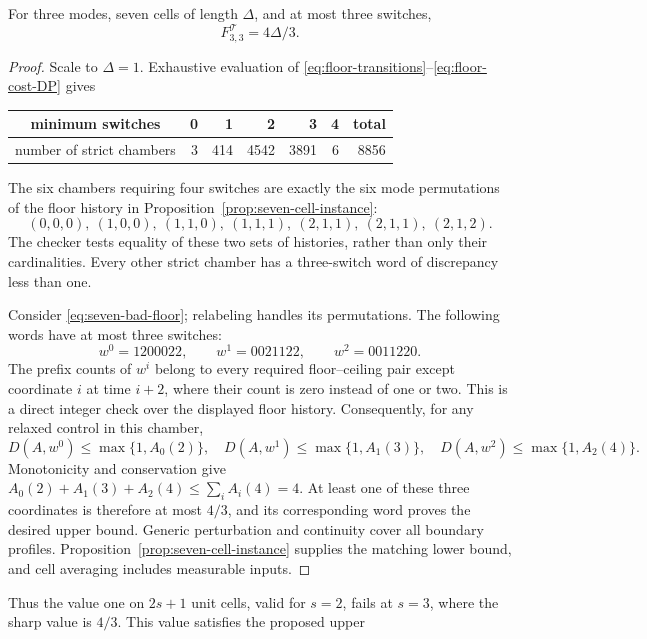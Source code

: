 \begin{theorem}\label{thm:seven-cells}
For three modes, seven cells of length $\Delta$, and at most three switches,
\begin{equation}\label{eq:seven-cells}
 F^{\mathcal T}_{3,3}=4\Delta/3.
\end{equation}
\end{theorem}
\begin{proof}
Scale to $\Delta=1$. Exhaustive evaluation of
\eqref{eq:floor-transitions}--\eqref{eq:floor-cost-DP} gives
\begin{center}
\begin{tabular}{c|rrrrr|r}
minimum switches&0&1&2&3&4&total\\\hline
number of strict chambers&3&414&4542&3891&6&8856
\end{tabular}
\end{center}
The six chambers requiring four switches are exactly the six mode
permutations of the floor history in
Proposition~\ref{prop:seven-cell-instance}:
\begin{equation}\label{eq:seven-bad-floor}
 (0,0,0),\ (1,0,0),\ (1,1,0),\ (1,1,1),\
 (2,1,1),\ (2,1,1),\ (2,1,2).
\end{equation}
The checker tests equality of these two sets of histories, rather than only
their cardinalities. Every other strict chamber has a three-switch word
of discrepancy less than one.

Consider \eqref{eq:seven-bad-floor}; relabeling handles its permutations.
The following words have at most three switches:
\[
 w^0=1200022,\qquad w^1=0021122,\qquad w^2=0011220.
\]
The prefix counts of $w^i$ belong to every required floor--ceiling pair
except coordinate $i$ at time $i+2$, where their count is zero instead
of one or two. This is a direct integer check over the displayed floor
history. Consequently, for any relaxed control in this chamber,
\[
 D(A,w^0)\le\max\{1,A_0(2)\},\quad
 D(A,w^1)\le\max\{1,A_1(3)\},\quad
 D(A,w^2)\le\max\{1,A_2(4)\}.
\]
Monotonicity and conservation give
$A_0(2)+A_1(3)+A_2(4)\le\sum_i A_i(4)=4$.
At least one of these three coordinates is therefore at most $4/3$,
and its corresponding word proves the desired upper bound.
Generic perturbation and continuity cover all boundary profiles.
Proposition~\ref{prop:seven-cell-instance} supplies the matching lower
bound, and cell averaging includes measurable inputs.
\end{proof}
Thus the value one on $2s+1$ unit cells, valid for $s=2$, fails at $s=3$,
where the sharp value is $4/3$. This value satisfies the proposed upper
